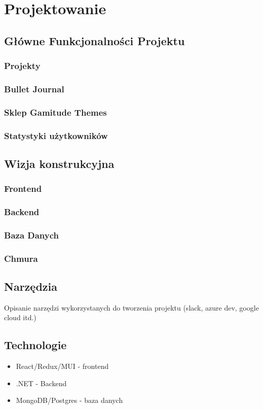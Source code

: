 \documentclass[a4paper,11pt]{report}
\begin{document}
\chapter {Projektowanie}
\section {Główne Funkcjonalności Projektu}
\subsection {Projekty}
\subsection {Bullet Journal}
\subsection {Sklep Gamitude Themes}
\subsection {Statystyki użytkowników}
\section {Wizja konstrukcyjna}
\subsection{Frontend} 
\subsection{Backend}
\subsection{Baza Danych}
\subsection{Chmura}
\section{Narzędzia}
Opisanie narzędzi wykorzystanych do tworzenia projektu (slack, azure dev, google cloud itd.)
\section{Technologie}
		\begin{itemize}
			\item React/Redux/MUI - frontend
			\item .NET - Backend
			\item MongoDB/Postgres - baza danych
		\end{itemize}
\end{document}
